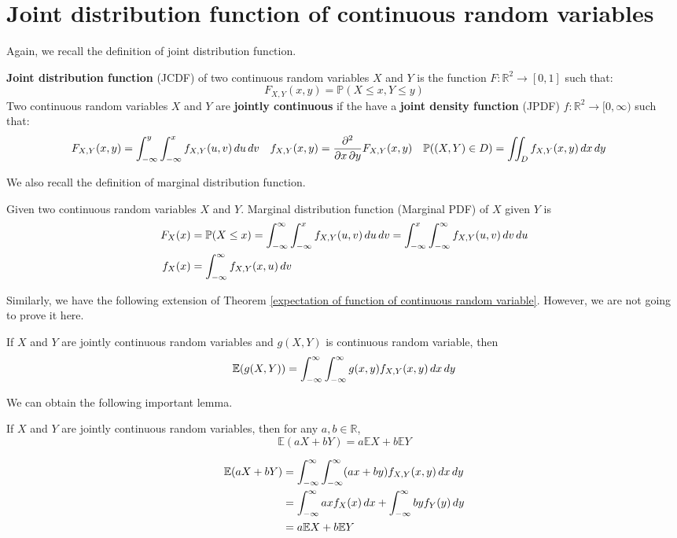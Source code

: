 \documentclass{huhtakm-template-book}
\newcommand{\prob}{\mathbb{P}}
\newcommand{\expect}{\mathbb{E}}
\begin{document}
\section{Joint distribution function of continuous random variables}
Again, we recall the definition of joint distribution function.
\begin{defn}
	\textbf{Joint distribution function} (JCDF) of two continuous  random variables $X$ and $Y$ is the function $F:\mathbb{R}^{2}\to[0,1]$ such that:
	\begin{equation*}
		F_{X,Y}(x,y)=\prob(X\leq x,Y\leq y)
	\end{equation*}
	Two continuous random variables $X$ and $Y$ are \textbf{jointly continuous} if the have a \textbf{joint density function} (JPDF) $f:\mathbb{R}^{2}\to[0,\infty)$ such that:
	\begin{align*}
		F_{X,Y}(x,y)&=\intlu{-\infty}{y}\intlu{-\infty}{x}f_{X,Y}(u,v)\,du\,dv & f_{X,Y}(x,y)&=\pdv*{F_{X,Y}(x,y)}{x,y} & \prob((X,Y)\in D)&=\iint_{D}f_{X,Y}(x,y)\,dx\,dy
	\end{align*}
\end{defn}
We also recall the definition of marginal distribution function.
\begin{defn}
	Given two continuous random variables $X$ and $Y$. Marginal distribution function (Marginal PDF) of $X$ given $Y$ is
	\begin{align*}
		F_{X}(x)&=\prob(X\leq x)=\intinfty\intlu{-\infty}{x}f_{X,Y}(u,v)\,du\,dv=\intlu{-\infty}{x}\intinfty f_{X,Y}(u,v)\,dv\,du\\
		f_{X}(x)&=\intinfty f_{X,Y}(x,u)\,dv
	\end{align*}
\end{defn}
Similarly, we have the following extension of Theorem \ref{expectation of function of continuous random variable}. However, we are not going to prove it here.
\begin{thm}
	If $X$ and $Y$ are jointly continuous random variables and $g(X,Y)$ is continuous random variable, then
	\begin{equation*}
		\expect(g(X,Y))=\intinfty\intinfty g(x,y)f_{X,Y}(x,y)\,dx\,dy
	\end{equation*}
\end{thm}

\newpage
We can obtain the following important lemma.
\begin{lem}
	If $X$ and $Y$ are jointly continuous random variables, then for any $a,b\in\mathbb{R}$,
	\begin{equation*}
		\expect(aX+bY)=a\expect X+b\expect Y
	\end{equation*}
\end{lem}
\begin{proofing}
	\begin{align*}
		\expect(aX+bY)&=\intinfty\intinfty(ax+by)f_{X,Y}(x,y)\,dx\,dy\\
		&=\intinfty axf_{X}(x)\,dx+\intinfty byf_{Y}(y)\,dy\\
		&=a\expect X+b\expect Y
	\end{align*}
\end{proofing}
\end{document}
